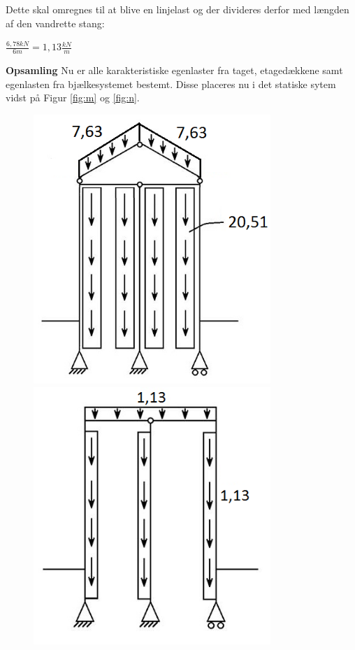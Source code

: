 Dette skal omregnes til at blive en linjelast og der divideres derfor med længden af den vandrette stang:
\begin{center}
$\frac{6,\!78 kN}{6m} = 1,\!13 \frac{kN}{m}$
\end{center}

\textbf{Opsamling}
\newline
Nu er alle karakteristiske egenlaster fra taget, etagedækkene samt egenlasten fra bjælkesystemet bestemt. Disse placeres nu i det statiske sytem vidst på Figur \ref{fig:m} og \ref{fig:n}.

\begin{figure}[H]\centering
	\begin{minipage}[b]{0.48\textwidth}\centering
		\includegraphics[width=0.80\textwidth]{billeder/egenlastetage.png} %
	\end{minipage}\hfill
	\begin{minipage}[b]{0.48\textwidth}\centering
		\includegraphics[width=0.8\textwidth]{billeder/egenlaststaal.png} %

\end{minipage}
\end{figure}
